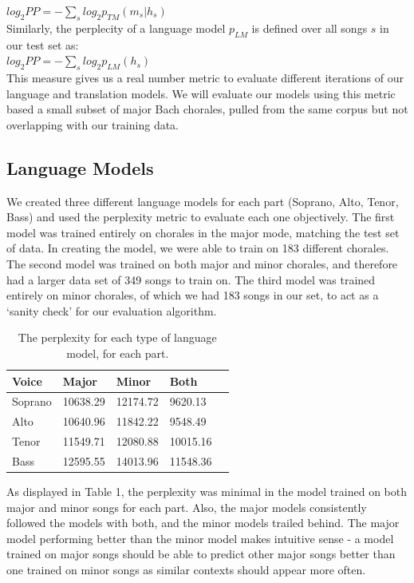 \documentclass{sig-alternate}
\begin{document}
$log_2 PP = - \sum_{s} log_2 p_{TM}(m_s|h_s)$\\

Similarly, the perplecity of a language model $p_{LM}$ is defined over all songs $s$ in our test set as:\\

$log_2 PP = - \sum_{s} log_2 p_{LM}(h_s)$\\

This measure gives us a real number metric to evaluate different iterations of our language and translation models. We will evaluate our models using this metric based a small subset of major Bach chorales, pulled from the same corpus but not overlapping with our training data.

\subsection{Language Models}
We created three different language models for each part (Soprano, Alto, Tenor, Bass) and used the perplexity metric to evaluate each one objectively. The first model was trained entirely on chorales in the major mode, matching the test set of data. In creating the model, we were able to train on 183 different chorales. The second model was trained on both major and minor chorales, and therefore had a larger data set of 349 songs to train on. The third model was trained entirely on minor chorales, of which we had 183 songs in our set, to act as a `sanity check' for our evaluation algorithm.
\begin{table}[h]
  \begin{center}
      \begin{tabular}{| l | l | l | l | l |}
      \hline
       Voice & Major & Minor & Both \\ \hline
       Soprano &  10638.29 & 12174.72 & 9620.13  \\ \hline
       Alto &  10640.96 & 11842.22 & 9548.49 \\ \hline
       Tenor & 11549.71 & 12080.88 & 10015.16 \\ \hline
       Bass & 12595.55 & 14013.96 & 11548.36 \\ \hline
      \end{tabular}
  \end{center}
  \caption{The perplexity for each type of language model, for each part.}
\end{table}

As displayed in Table 1, the perplexity was minimal in the model trained on both major and minor songs for each part. Also, the major models consistently followed the models with both, and the minor models trailed behind. The major model performing better than the minor model makes intuitive sense - a model trained on major songs should be able to predict other major songs better than one trained on minor songs as similar contexts should appear more often. 
\end{document}
